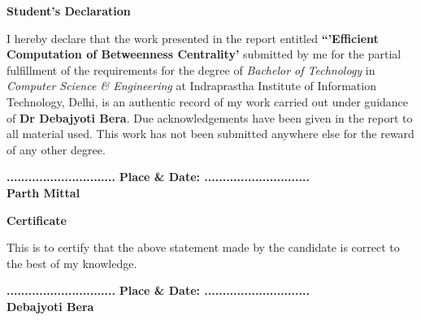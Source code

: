 \newpage

\begin{center}
\textbf{\Large Student's Declaration}\label{section:declaration}
\end{center}
I hereby declare that the work presented in the report entitled
\textbf{``'Efficient Computation of Betweenness Centrality'} submitted by me
for the partial fulfillment of the requirements for the degree of
\emph{Bachelor of Technology} in \emph{Computer Science \& Engineering} at
 Indraprastha Institute of Information Technology, Delhi, is an authentic
 record of my work carried out under guidance of \textbf{Dr Debajyoti Bera}.
 Due acknowledgements have  been given in the report to all material used.
 This work has not been submitted anywhere else for the reward of any other degree.
 \\ \vspace{0.5in}

\textbf{..............................}\hfill
\textbf{ Place \& Date: .............................} \\
\textbf{Parth Mittal}

\vspace{3in}
\begin{center}
\textbf{\Large Certificate} \label{section:certificate}
\end{center}
This is to certify that the above statement made by the candidate is correct to the best of my knowledge.
 \\ \vspace{0.4in}

\textbf{..............................}\hfill
\textbf{ Place \& Date: .............................} \\
\textbf{Debajyoti Bera}\\

\pagebreak
